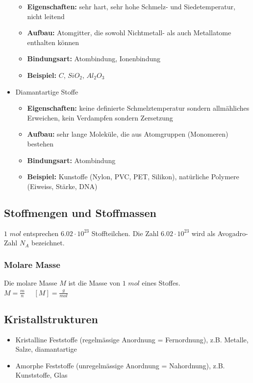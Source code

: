 \begin{itemize}
	\begin{itemize}
	    \item \textbf{Eigenschaften:} sehr hart, sehr hohe Schmelz- und Siedetemperatur, nicht leitend
	    \item \textbf{Aufbau:} Atomgitter, die sowohl Nichtmetall- als auch Metallatome enthalten können
	    \item \textbf{Bindungsart:} Atombindung, Ionenbindung
	    \item \textbf{Beispiel:} $C$, $SiO_2$, $Al_2O_3$
	\end{itemize}
	\item Diamantartige Stoffe
	\begin{itemize}
	    \item \textbf{Eigenschaften:} keine definierte Schmelztemperatur sondern allmähliches Erweichen, kein Verdampfen sondern Zersetzung
	    \item \textbf{Aufbau:} sehr lange Moleküle, die aus Atomgruppen (Monomeren) bestehen
	    \item \textbf{Bindungsart:} Atombindung
	    \item \textbf{Beispiel:} Kunstoffe (Nylon, PVC, PET, Silikon), natürliche Polymere (Eiweiss, Stärke, DNA)
	\end{itemize}
\end{itemize}

\subsection{Stoffmengen und Stoffmassen}
$1$ $mol$ entsprechen $6.02 \cdot 10^{23}$ Stoffteilchen. Die Zahl $6.02 \cdot 10^{23}$ wird als Avogadro-Zahl $N_A$ bezeichnet.

\subsubsection{Molare Masse}
Die molare Masse $M$ ist die Masse von $1$ $mol$ eines Stoffes. \\
$M=\frac{m}{n}$ \ \ $[M]=\frac{g}{mol}$

\subsection{Kristallstrukturen}
\begin{itemize}
	\item Kristalline Feststoffe (regelmässige Anordnung = Fernordnung), z.B. Metalle, Salze, diamantartige
	\item Amorphe Feststoffe (unregelmässige Anordnung = Nahordnung), z.B. Kunststoffe, Glas
\end{itemize}

